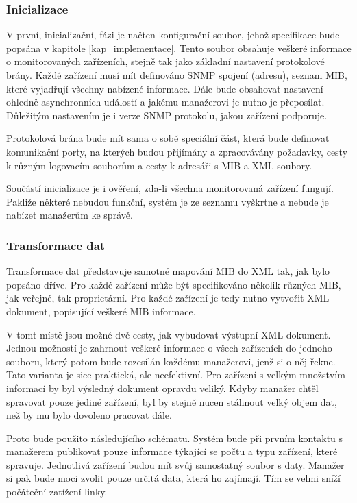 \subsubsection{Inicializace}
V první, inicializační, fázi je načten konfigurační soubor, jehož specifikace bude popsána v kapitole \ref{kap_implementace}. Tento soubor obsahuje veškeré informace o monitorovaných zařízeních, stejně tak
jako základní nastavení protokolové brány. Každé zařízení musí mít definováno SNMP spojení (adresu), seznam MIB, které vyjadřují všechny nabízené informace. Dále bude obsahovat nastavení ohledně 
asynchronních událostí a jakému manažerovi je nutno je přeposílat. Důležitým nastavením je i verze SNMP protokolu, jakou zařízení podporuje.

Protokolová brána bude mít sama o sobě speciální část, která bude definovat komunikační porty, na kterých budou přijímány a zpracovávány požadavky, cesty k různým logovacím souborům a cesty k adresáři s MIB a XML soubory.

Součástí inicializace je i ověření, zda-li všechna monitorovaná zařízení fungují. Pakliže některé nebudou funkční, systém je ze seznamu vyškrtne a nebude je nabízet manažerům ke správě.

\subsubsection{Transformace dat}
Transformace dat představuje samotné mapování MIB do XML tak, jak bylo popsáno dříve. Pro každé zařízení může být specifikováno několik různých MIB, jak veřejné, tak proprietární. Pro každé
zařízení je tedy nutno vytvořit XML dokument, popisující veškeré MIB informace.

V tomt místě jsou možné dvě cesty, jak vybudovat výstupní XML dokument. Jednou možností je zahrnout veškeré informace o všech zařízeních do jednoho souboru, který potom bude rozesílán každému manažerovi, jenž si o něj řekne. Tato varianta
je sice praktická, ale neefektivní. Pro zařízení s velkým množstvím informací by byl výsledný dokument opravdu veliký. Kdyby manažer chtěl spravovat pouze jediné zařízení, byl by stejně nucen stáhnout velký objem dat, než
by mu bylo dovoleno pracovat dále.

Proto bude použito následujícího schématu. Systém bude při prvním kontaktu s manažerem publikovat pouze informace týkající se počtu a typu zařízení, které spravuje. Jednotlivá zařízení budou mít svůj samostatný soubor
s daty. Manažer si pak bude moci zvolit pouze určitá data, která ho zajímají. Tím se velmi sníží počáteční zatížení linky.

